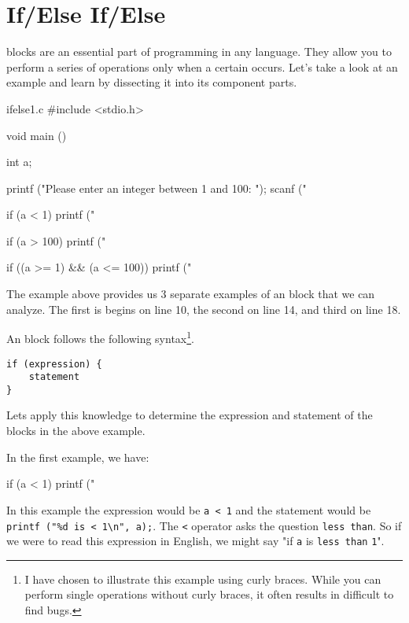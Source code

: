 \chapter{If/Else If/Else}

 blocks are an essential part of programming in any language. They
allow you to perform a series of operations only when a certain
 occurs. Let's take a look at an example and learn by
dissecting it into its component parts.

\begin{code}{ifelse1.c}
#include <stdio.h>

void main ()
{
    int a;

    printf ("Please enter an integer between 1 and 100:  ");
    scanf ("%

    if (a < 1) {
        printf ("%
    }

    if (a > 100) {
        printf ("%
    }

    if ((a >= 1) && (a <= 100)) {
        printf ("%
    }
}
\end{code}

The example above provides us 3 separate examples of an  block that
we can analyze. The first is begins on line 10, the second on line 14, and third
on line 18.

An  block follows the following syntax\footnote{I have chosen to
illustrate this example using curly braces. While you can perform single
operations without curly braces, it often results in difficult to find bugs.}.

\begin{Verbatim}
if (expression) {
    statement
}
\end{Verbatim}

Lets apply this knowledge to determine the expression and statement of the
 blocks in the above example.

In the first example, we have:

\begin{code}{}
if (a < 1) {
    printf ("%
}
\end{code}

In this example the expression would be \verb|a < 1| and the statement
would be \verb|printf ("%d is < 1\n", a);|. The \verb|<| operator asks the
question \verb|less than|. So if we were to read this expression in English,
we might say "if \verb|a| is \verb|less than| \verb|1|".

